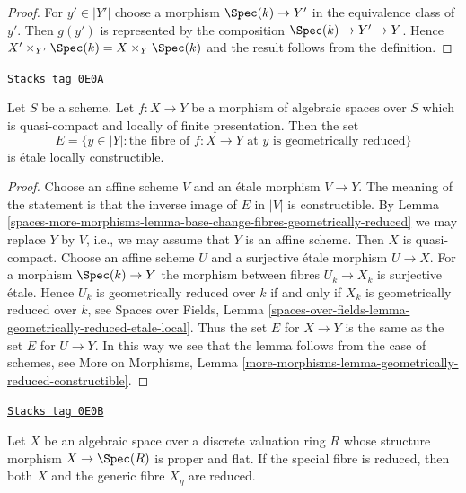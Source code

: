 \begin{proof}
For $y' \in |Y'|$ choose a morphism $\Spec(k) \to Y'$
in the equivalence class of $y'$. Then $g(y')$ is
represented by the composition $\Spec(k) \to Y' \to Y$.
Hence $X' \times_{Y'} \Spec(k) = X \times_Y \Spec(k)$
and the result follows from the definition.
\end{proof}

\begin{lemma}
\label{spaces-more-morphisms-lemma-geometrically-reduced-constructible}
\href{https://stacks.math.columbia.edu/tag/0E0A}{\texttt{Stacks tag 0E0A}}

Let $S$ be a scheme. Let $f : X \to Y$ be a morphism of algebraic spaces
over $S$ which is quasi-compact and
locally of finite presentation. Then the set
$$
E = \{y \in |Y| : \text{the fibre of }f : X \to Y\text{ at }y
\text{ is geometrically reduced}\}
$$
is \'etale locally constructible.
\end{lemma}

\begin{proof}
Choose an affine scheme $V$ and an \'etale morphism $V  \to Y$.
The meaning of the statement is that the inverse image of $E$
in $|V|$ is constructible. By
Lemma \ref{spaces-more-morphisms-lemma-base-change-fibres-geometrically-reduced}
we may replace $Y$ by $V$, i.e., we may assume that $Y$
is an affine scheme. Then $X$ is quasi-compact. Choose an
affine scheme $U$ and a surjective \'etale morphism $U \to X$.
For a morphism $\Spec(k) \to Y$ the morphism between fibres
$U_k \to X_k$ is surjective \'etale. Hence $U_k$ is geometrically
reduced over $k$ if and only if $X_k$ is geometrically reduced
over $k$, see Spaces over Fields, Lemma
\ref{spaces-over-fields-lemma-geometrically-reduced-etale-local}.
Thus the set $E$ for $X \to Y$ is the same as the set $E$
for $U \to Y$.
In this way we see that the lemma follows from the case
of schemes, see More on Morphisms, Lemma
\ref{more-morphisms-lemma-geometrically-reduced-constructible}.
\end{proof}

\begin{lemma}
\label{spaces-more-morphisms-lemma-proper-flat-over-dvr-reduced-fibre}
\href{https://stacks.math.columbia.edu/tag/0E0B}{\texttt{Stacks tag 0E0B}}

Let $X$ be an algebraic space over a discrete valuation ring $R$
whose structure morphism $X \to \Spec(R)$ is proper and flat.
If the special fibre is reduced, then
both $X$ and the generic fibre $X_\eta$ are reduced.
\end{lemma}

